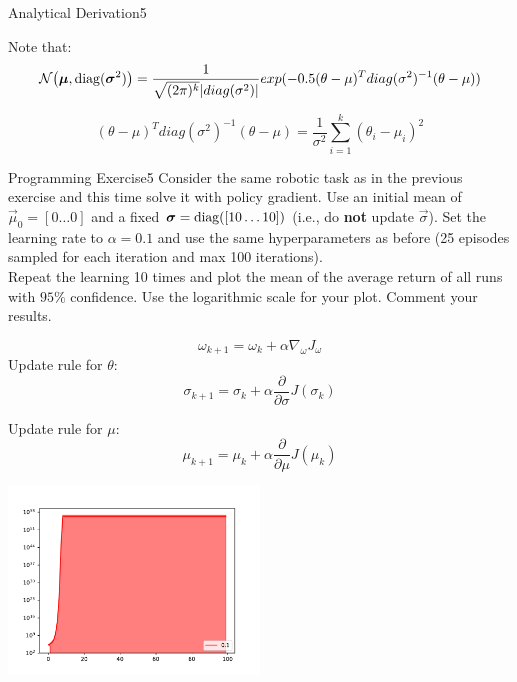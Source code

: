 \begin{questions}
\begin{question}{Analytical Derivation}{5}
\begin{answer}
Note that:
 	 		\begin{equation}
 	 		\mathcal{N}\big({\boldsymbol{\mu}}, \operatorname{\mathrm{diag}}({\boldsymbol{\sigma}}^2)\big)=\frac{1}{\sqrt{(2\pi)^k} |diag(\sigma^2)|} exp(-0.5 (\theta-\mu)^T diag(\sigma^2)^{-1} (\theta-\mu))
 	 		\end{equation}	 	
 		
 	\begin{equation}
(\theta-\mu)^T diag(\sigma^2)^{-1} (\theta-\mu) = \frac{1}{\sigma^2} \sum_{i=1}^k (\theta_i - \mu_i)^2
  \end{equation}

	\end{answer}

\end{question}


\begin{question}{Programming Exercise}{5}
	Consider the same robotic task as in the previous exercise and this time solve it with policy gradient. 
	Use an initial mean of $\vec \mu_0 = [0 \dots 0]$ and a fixed ${\boldsymbol{\sigma}} = \operatorname{\mathrm{diag}}([10 \dots 10])$ (i.e., do \textbf{not} update $\vec\sigma$). Set the learning rate to $\alpha=0.1$ and use the same hyperparameters as before (25 episodes sampled for each iteration and max 100 iterations).\\
	Repeat the learning 10 times and plot the mean of the average return of all runs with $95\%$ confidence.
	Use the logarithmic scale for your plot. Comment your results.
	
	\begin{answer}
	\begin{equation}
		\omega_{k+1}=\omega_k + \alpha \nabla_{\omega} J_{\omega}
	\end{equation}
Update rule for $\theta$:
		\begin{equation}
		\sigma_{k+1}=\sigma_k + \alpha \frac{\partial}{\partial \sigma} J({\sigma_k})
		\end{equation}
		
		Update rule for $\mu$:
		\begin{equation}
		\mu_{k+1}=\mu_k + \alpha \frac{\partial}{\partial \mu}  J({\mu_k})
		\end{equation}

\begin{center}
	\includegraphics[width=0.5\textwidth]{img/PG-b.pdf}
\end{center}


\end{answer}
\end{question}
\end{questions}
